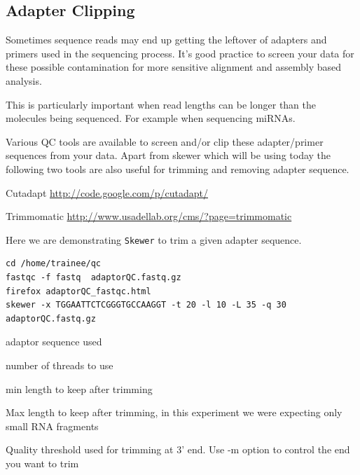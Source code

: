 \begin{advanced}
\subsection{Adapter Clipping}
Sometimes sequence reads may end up getting the leftover of adapters and primers
used in the sequencing process. It's good practice to screen your data for
these possible contamination for more sensitive alignment and assembly based
analysis.

\begin{note}
This is particularly important when read lengths can be longer than the
molecules being sequenced. For example when sequencing miRNAs.
\end{note}

Various QC tools are available to screen and/or clip these adapter/primer
sequences from your data. Apart from skewer which will be using today the 
following two tools are also useful for trimming and removing adapter sequence.

Cutadapt 
\url{http://code.google.com/p/cutadapt/}

Trimmomatic 
\url{http://www.usadellab.org/cms/?page=trimmomatic}

\begin{steps}
Here we are demonstrating \texttt{Skewer} to trim a given adapter
sequence.

\begin{lstlisting}
cd /home/trainee/qc
fastqc -f fastq  adaptorQC.fastq.gz
firefox adaptorQC_fastqc.html 
skewer -x TGGAATTCTCGGGTGCCAAGGT -t 20 -l 10 -L 35 -q 30 adaptorQC.fastq.gz
\end{lstlisting}
\end{steps}

\begin{note}
\begin{description}[style=multiline,labelindent=0cm,align=right,leftmargin=\descriptionlabelspace,rightmargin=1.5cm,font=\ttfamily]
\item[-x] adaptor sequence used
\item[-t] number of threads to use
\item[-l] min length to keep after trimming
\item[-L] Max length to keep after trimming, in this experiment we were expecting only small RNA fragments
\item[-Q] Quality threshold used for trimming at 3' end. Use -m option to control the end you want to trim
\end{description}
\end{note}


\end{advanced}
